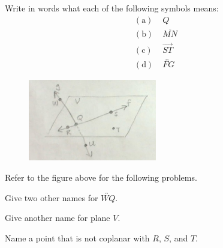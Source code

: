 \documentclass[12pt]{article}
\newcommand{\Z}{\mathbb{Z}}
\newenvironment{theorem}[2][Theorem]{\begin{trivlist}
\item[\hskip \labelsep {\bfseries #1}\hskip \labelsep {\bfseries #2.}]}{\end{trivlist}}
\newenvironment{problem}[2][Problem]{\begin{trivlist}
\item[\hskip \labelsep {\bfseries #1}\hskip \labelsep {\bfseries #2.}]}{\end{trivlist}}
\begin{document}

 




 




\begin{problem}{1}
Write in words what each of the following symbols means:
\[
\begin{split}
	\mathrm{(a)}\; &Q \\
	\mathrm{(b)}\; &\overline{MN} \\
	\mathrm{(c)}\; &\vec{ST} \\
	\mathrm{(d)}\; &\overleftrightarrow{FG}
\end{split}
\]
\end{problem}
 
\begin{figure}[H]
\centering
\includegraphics[width=0.5\textwidth]{one.jpg}
\end{figure}

Refer to the figure above for the following problems.

\begin{problem}{2}
Give two other names for $\overleftrightarrow{WQ}$.
\end{problem}

\begin{problem}{3}
Give another name for plane $V$.
\end{problem}

\begin{problem}{4}
Name a point that is not coplanar with $R$, $S$, and $T$.
\end{problem}
\end{document}
